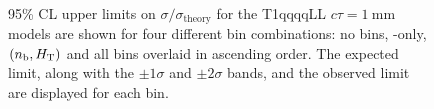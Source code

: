 \begin{figure}[!h]
    \centering
     ~~
    \caption{
        95\% CL upper limits on $\sigma/\sigma_{\mathrm{theory}}$ for the
        T1qqqqLL $c\tau=1~\mathrm{mm}$ models are shown for four different
        bin combinations: no bins, \scalht-only, $(n_{\text{b}},\mbox{$H_\text{T}$})$ and all bins
        overlaid in ascending order. The expected limit, along with the
        $\pm 1\sigma$ and $\pm 2\sigma$ bands, and the observed limit are
        displayed for each bin.
    }
    \label{fig:T1qqqqLL_ctau_1_limitsPerBin}
\end{figure}

